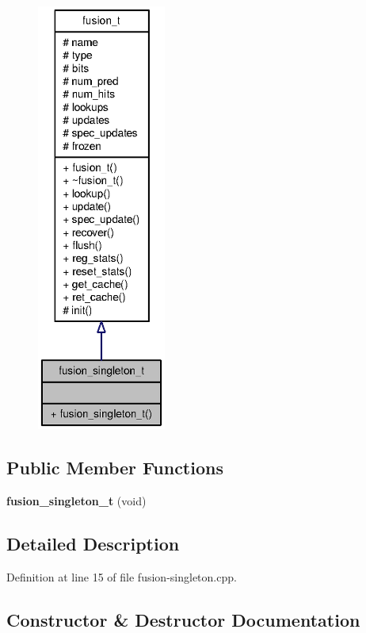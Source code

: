 \begin{figure}[H]
\begin{center}
\leavevmode
\includegraphics[height=400pt]{classfusion__singleton__t__coll__graph}
\end{center}
\end{figure}
\subsection*{Public Member Functions}
\begin{CompactItemize}
\item 
{\bf fusion\_\-singleton\_\-t} (void)
\end{CompactItemize}


\subsection{Detailed Description}


Definition at line 15 of file fusion-singleton.cpp.

\subsection{Constructor \& Destructor Documentation}

